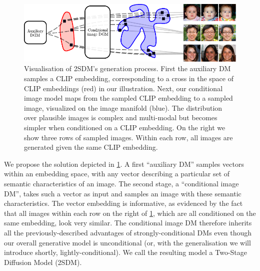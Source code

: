 \begin{figure}[t]
    \centering
    \includegraphics[width=\textwidth]{figs/2sdm/vcdm-diagram.pdf}
    \caption{Visualisation of 2SDM's generation process. First the auxiliary DM samples a CLIP embedding, corresponding to a cross in the space of CLIP embeddings (red) in our illustration. Next, our conditional image model maps from the sampled CLIP embedding to a sampled image, visualized on the image manifold (blue). The distribution over plausible images is complex and multi-modal but becomes simpler when conditioned on a CLIP embedding. On the right we show three rows of sampled images. Within each row, all images are generated given the same CLIP embedding.}
    \label{fig:samples}
\end{figure}
We propose the solution depicted in \cref{fig:samples}. A first ``auxiliary DM'' samples vectors within an embedding space, with any vector describing a particular set of semantic characteristics of an image. The second stage, a ``conditional image DM'', takes such a vector as input and samples an image with these semantic characteristics. The vector embedding is informative, as evidenced by the fact that all images within each row on the right of \cref{fig:samples}, which are all conditioned on the same embedding, look very similar. The conditional image DM therefore inherits all the previously-described advantages of strongly-conditional DMs even though our overall generative model is unconditional (or, with the generalisation we will introduce shortly, lightly-conditional). We call the resulting model a Two-Stage Diffusion Model (2SDM).

